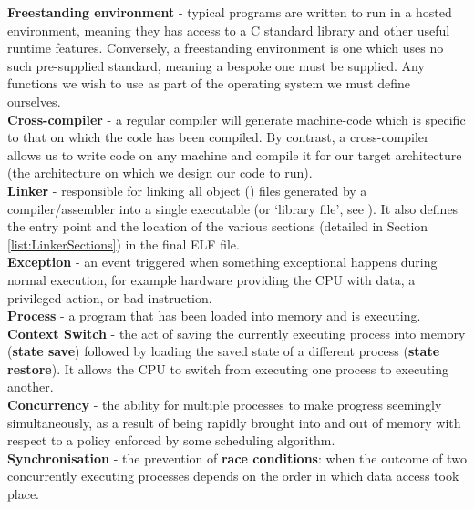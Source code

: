     \noindent \textbf{Freestanding environment} - typical programs are written
    to run in a hosted environment, meaning they has access to a C standard
    library and other useful runtime features. Conversely, a freestanding
    environment is one which uses no such pre-supplied standard, meaning a
    bespoke one must be supplied. Any functions we wish to use as part of the
    operating system we must define ourselves. \\

    \noindent \textbf{Cross-compiler} - a regular compiler will generate
    machine-code which is specific to that on which the code has been compiled.
    By contrast, a  cross-compiler allows us to write code on any machine and
    compile it for our target architecture (the architecture on which we design
    our code to run). \\

    \noindent \textbf{Linker} - responsible for linking all object ()
    files generated by a compiler/assembler into a single executable (or
    `library file', see \cite{StaticLibrary}). It also defines the entry point
    and the location of the various sections (detailed in Section
    \ref{list:LinkerSections}) in the final ELF file.\\

    \noindent \textbf{Exception} - an event triggered when something exceptional
    happens during normal execution, for example hardware providing the CPU with
    data, a privileged action, or bad instruction. \\

    \noindent \textbf{Process} - a program that has been loaded into memory and is
    executing. \\

    \noindent \textbf{Context Switch} - the act of saving the currently
    executing process into memory (\textbf{state save}) followed by loading the
    saved state of a different process (\textbf{state restore}). It allows the
    CPU to switch from executing one process to executing another. \\

    \noindent \textbf{Concurrency} - the ability for multiple processes to make
    progress seemingly simultaneously, as a result of being rapidly brought into
    and out of memory with respect to a policy enforced by some scheduling
    algorithm. \\

    \noindent \textbf{Synchronisation} - the prevention of \textbf{race
    conditions}: when the outcome of two concurrently executing processes
    depends on the order in which data access took place. \\

